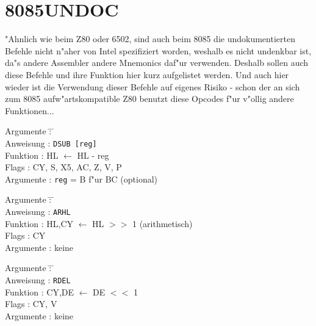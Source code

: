 \documentclass[12pt,a4paper,twoside]{report}
\newcommand{\tty}[1]{{\tt #1}}
\begin{document}
{%

\section{8085UNDOC}
\label{8085Spec}

"Ahnlich wie beim Z80 oder 6502, sind auch beim 8085 die undokumentierten 
Befehle nicht n"aher von Intel spezifiziert worden, weshalb es nicht
undenkbar ist, da"s andere Assembler andere Mnemonics daf"ur verwenden. 
Deshalb sollen auch diese Befehle und ihre Funktion hier kurz aufgelistet
werden.  Und auch hier wieder ist die Verwendung dieser Befehle auf
eigenes Risiko - schon der an sich zum 8085 aufw"artskompatible Z80
benutzt diese Opcodes f"ur v"ollig andere Funktionen...

\begin{tabbing}
Argumente         \= : \= \kill \\
Anweisung         \> : \> \tty{DSUB [reg]} \\
Funktion          \> : \> HL $\leftarrow$ HL - reg \\
Flags             \> : \> CY, S, X5, AC, Z, V, P \\
Argumente         \> : \> \tty{reg} = B f"ur BC (optional) \\
\end{tabbing}

\begin{tabbing}
Argumente         \= : \= \kill \\
Anweisung         \> : \> \tty{ARHL} \\
Funktion          \> : \> HL,CY $\leftarrow$ HL $>>$ 1 (arithmetisch) \\
Flags             \> : \> CY \\
Argumente         \> : \> keine \\
\end{tabbing}

\begin{tabbing}
Argumente         \= : \= \kill \\
Anweisung         \> : \> \tty{RDEL} \\
Funktion          \> : \> CY,DE $\leftarrow$ DE $<<$ 1 \\
Flags             \> : \> CY, V \\
Argumente         \> : \> keine \\
\end{tabbing}

}
\end{document}
